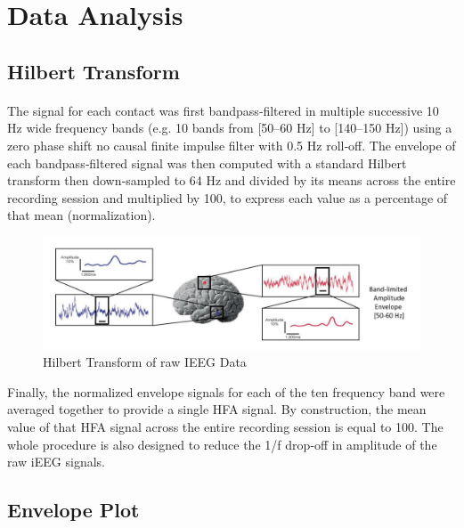 \documentclass[a4paper]{article}
\begin{document}
\section{Data Analysis} \label{analysis}    
\subsection{Hilbert Transform}
\paragraph{} The signal for each contact was first bandpass‐filtered in multiple successive 10 Hz wide frequency bands (e.g. 10 bands from [50–60 Hz] to [140–150 Hz]) using a zero phase shift no causal finite impulse filter with 0.5 Hz roll‐off. The envelope of each bandpass‐filtered signal was then computed with a standard Hilbert transform then down‐sampled to 64 Hz and divided by its means across the entire recording session and multiplied by 100, to express each value as a percentage of that mean (normalization).  

\begin{figure}[H]
\begin{center}
\includegraphics[scale=0.4]{HilbertProcessing.png}
\end{center}
\caption{\label{HilbertProcessingPicture}Hilbert Transform of raw IEEG Data}
\end{figure}

Finally, the normalized envelope signals for each of the ten frequency band were averaged together to provide a single HFA signal. By construction, the mean value of that HFA signal across the entire recording session is equal to 100. The whole procedure is also designed to reduce the 1/f drop‐off in amplitude of the raw iEEG signals. 

\subsection{Envelope Plot}
\end{document}
